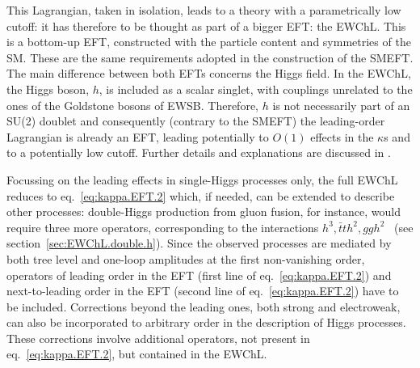 This Lagrangian, taken in isolation, leads to a theory with a parametrically low cutoff: it has therefore to be thought as part of a bigger EFT: the EWChL\cite{Dobado:1989ax,Dobado:1989ue,Dobado:1990zh,Dobado:1990jy,Espriu:1991vm,Herrero:1993nc,Herrero:1994iu,Feruglio:1992wf,Bagger:1993zf,Koulovassilopoulos:1993pw,Burgess:1999ha,Wang:2006im,Grinstein:2007iv,Azatov:2012bz,Alonso:2012px,Buchalla:2012qq,Buchalla:2013rka,Buchalla:2013eza}. This is a bottom-up EFT, constructed with the particle content and symmetries of the SM. These are the same requirements adopted in the construction of the SMEFT. The main difference between both EFTs concerns the Higgs field. In the EWChL, the Higgs boson, $h$, is included as a scalar singlet, with couplings unrelated to the ones of the Goldstone bosons of EWSB. 
Therefore, $h$ is not necessarily part of an SU(2) doublet and consequently (contrary to the SMEFT) the leading-order Lagrangian is already an EFT, leading potentially to $O(1)$ effects in the $\kappa$s and to a potentially low cutoff.
Further details and explanations  are discussed in \cite{Guo:2015isa,Buchalla:2017jlu,Alonso:2017tdy,Buchalla:2013rka,Buchalla:2013eza,Buchalla:2015wfa,Buchalla:2016sop}.

Focussing on the leading effects in single-Higgs processes only, the full EWChL reduces to eq.~\eqref{eq:kappa.EFT.2} which, if needed,  can be extended to describe other processes:   double-Higgs production from gluon fusion, for instance, would require three more operators, corresponding to the interactions $h^{3},\bar{t}th^{2},ggh^{2}$~\cite{Grober:2015cwa,deFlorian:2016spz,Kim:2018uty,Buchalla:2018yce} (see section~\ref{sec:EWChL.double.h}). Since the observed processes are mediated by both tree level and one-loop amplitudes at the first non-vanishing order, operators of leading order in the EFT (first line of eq.~\eqref{eq:kappa.EFT.2}) and next-to-leading order in the EFT (second line of eq.~\eqref{eq:kappa.EFT.2}) have to be included\cite{Buchalla:2015wfa}. Corrections beyond the leading ones, both strong and electroweak, can also be incorporated to arbitrary order in the description of Higgs processes. These corrections involve additional operators, not present in eq.~\eqref{eq:kappa.EFT.2}, but contained in the EWChL.
 
